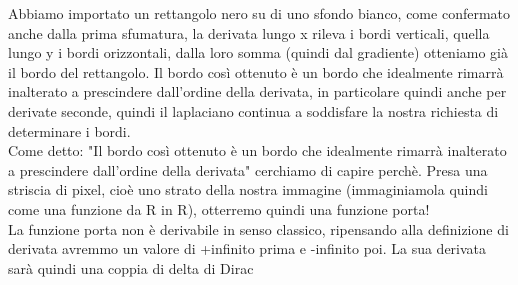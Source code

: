 Abbiamo importato un rettangolo nero su di uno sfondo bianco, come confermato anche dalla prima sfumatura, la derivata lungo x rileva i bordi verticali, quella lungo y i bordi orizzontali, dalla loro somma (quindi dal gradiente) otteniamo già il bordo del rettangolo.
Il bordo così ottenuto è un bordo che idealmente rimarrà inalterato a prescindere dall'ordine della derivata, in particolare quindi anche per derivate seconde, quindi il laplaciano continua a soddisfare la nostra richiesta di determinare i bordi. \\
Come detto: "Il bordo così ottenuto è un bordo che idealmente rimarrà inalterato a prescindere dall'ordine della derivata" cerchiamo di capire perchè. Presa una striscia di pixel, cioè uno strato della nostra immagine (immaginiamola quindi come una funzione da R in R), otterremo quindi una funzione porta!\\
La funzione porta non è derivabile in senso classico, ripensando alla definizione di derivata avremmo un valore di +infinito prima e -infinito poi. La sua derivata sarà quindi una coppia di delta di Dirac\\

